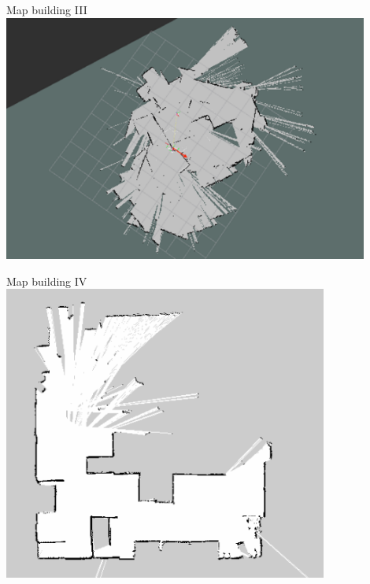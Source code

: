\begin{frame}{Map building III}
    \centering
    \includegraphics[width=0.9\textwidth]{gfx/map_messy.png}
\end{frame}
\begin{frame}{Map building IV}
\centering
\includegraphics[width=0.8\textwidth]{gfx/map.png}
\end{frame}


